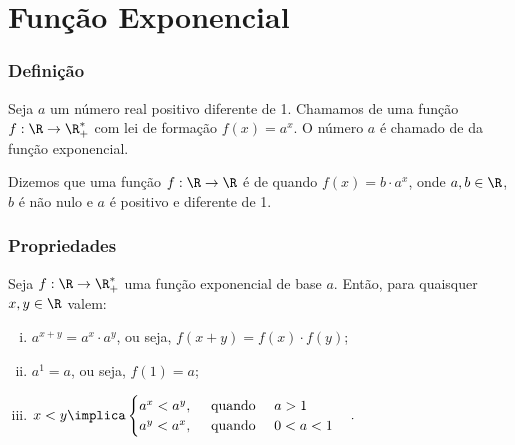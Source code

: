 \section{Função Exponencial}
\begin{frame} \frametitle{Definição}
\begin{definicao}
Seja $a$ um número real positivo diferente de 1. Chamamos de
 uma função $f: \R \to \R_+^\ast$ com lei de
formação $f(x) =
 a^x$. O número $a$ é chamado de  da função exponencial.
\end{definicao}\pause



\begin{definicao}
Dizemos que uma função $f: \R \to \R$ é de 
quando $f(x) =b\cdot a^x$, onde $a,b \in\R$, $b$ é não nulo e $a$ é
positivo e diferente de 1.
\end{definicao}





\end{frame}


\begin{frame}
\frametitle{Propriedades} 

\begin{proposicao}
Seja $f: \R \to \R_+^\ast$ uma função exponencial de base $a$.
Então, para quaisquer $x, y \in \R$ valem:
\begin{enumerate}[(i)]
	\item  $a^{x+y} = a^x\cdot a^y$, ou seja, $f(x+y) = f(x)\cdot f(y)$;
	\item $a^1 = a$, ou seja, $f(1) = a$;
	\item $x<y \implica \begin{cases} a^x < a^y, \ \ \ \text{ quando } \ \ \ a>1 \\
																		a^y < a^x, \ \ \ \text{ quando } \ \ \ 0<a<1
											 \end{cases}.$
\end{enumerate}
\end{proposicao}




\end{frame}


